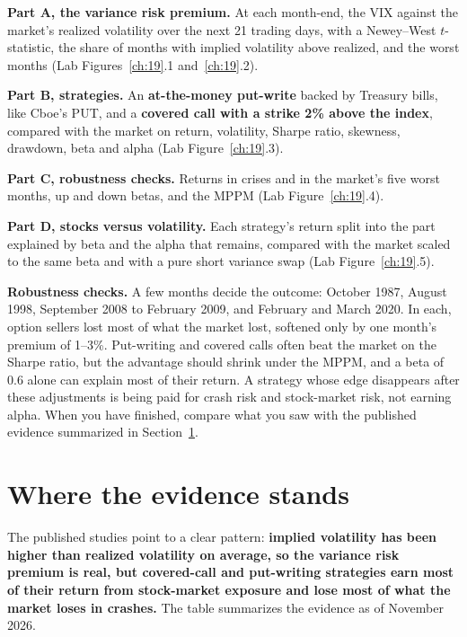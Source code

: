\textbf{Part A, the variance risk premium.} At each month-end, the VIX against the market's realized volatility over the next 21 trading days, with a Newey--West $t$-statistic, the share of months with implied volatility above realized, and the worst months (Lab Figures~\ref{ch:19}.1 and~\ref{ch:19}.2).

\textbf{Part B, strategies.} An \textbf{at-the-money put-write} backed by Treasury bills, like Cboe's PUT, and a \textbf{covered call with a strike 2\% above the index}, compared with the market on return, volatility, Sharpe ratio, skewness, drawdown, beta and alpha (Lab Figure~\ref{ch:19}.3).

\textbf{Part C, robustness checks.} Returns in crises and in the market's five worst months, up and down betas, and the MPPM (Lab Figure~\ref{ch:19}.4).

\textbf{Part D, stocks versus volatility.} Each strategy's return split into the part explained by beta and the alpha that remains, compared with the market scaled to the same beta and with a pure short variance swap (Lab Figure~\ref{ch:19}.5).

\label{sec:16-stress}
\textbf{Robustness checks.} A few months decide the outcome: October 1987, August 1998, September 2008 to February 2009, and February and March 2020. In each, option sellers lost most of what the market lost, softened only by one month's premium of 1--3\%. Put-writing and covered calls often beat the market on the Sharpe ratio, but the advantage should shrink under the MPPM, and a beta of 0.6 alone can explain most of their return. A strategy whose edge disappears after these adjustments is being paid for crash risk and stock-market risk, not earning alpha. When you have finished, compare what you saw with the published evidence summarized in Section~\ref{sec:16-verdict}.

\section{Where the evidence stands}
\label{sec:16-verdict}

The published studies point to a clear pattern: \textbf{implied volatility has been higher than realized volatility on average, so the variance risk premium is real, but covered-call and put-writing strategies earn most of their return from stock-market exposure and lose most of what the market loses in crashes.} The table summarizes the evidence as of November 2026.

